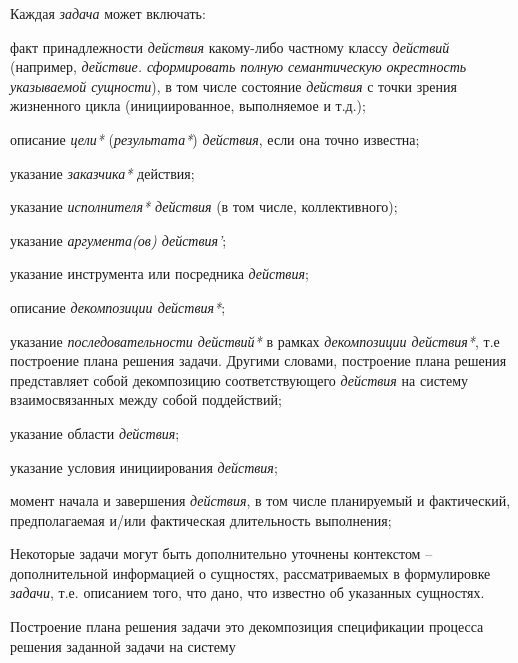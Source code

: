 \begin{SCn}
{Каждая \textit{задача} может включать:
\begin{scnitemize}
    \item факт принадлежности \textit{действия} какому-либо частному классу \textit{действий} (например,\textit{ действие. сформировать полную семантическую окрестность указываемой сущности}), в том числе состояние \textit{действия} с точки зрения жизненного цикла (инициированное, выполняемое и т.д.);
    \item описание \textit{цели*} (\textit{результата*}) \textit{действия}, если она точно известна;
    \item указание \textit{заказчика*} действия;
    \item указание \textit{исполнителя* действия} (в том числе, коллективного);
    \item указание \textit{аргумента(ов) действия’};
    \item указание инструмента или посредника \textit{действия};
    \item описание \textit{декомпозиции действия*};
    \item указание \textit{последовательности действий*} в рамках \textit{декомпозиции действия*}, т.е построение плана решения задачи. Другими словами, построение плана решения представляет собой декомпозицию соответствующего \textit{действия} на систему взаимосвязанных между собой поддействий;
    \item указание области \textit{действия};
    \item указание условия инициирования \textit{действия};
    \item момент начала и завершения \textit{действия}, в том числе планируемый и фактический, предполагаемая и/или фактическая длительность выполнения;
\end{scnitemize}
Некоторые задачи могут быть дополнительно уточнены контекстом – дополнительной информацией о сущностях, рассматриваемых в формулировке \textit{задачи}, т.е. описанием того, что дано, что известно об указанных сущностях.

Построение плана решения задачи это декомпозиция спецификации процесса решения заданной задачи на систему 
 
}
\end{SCn}
